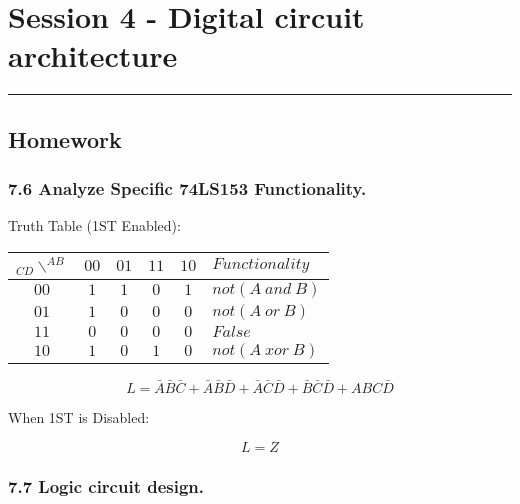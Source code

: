 \section{Session 4 - Digital circuit architecture}
\vspace{-15pt}\noindent\rule{\textwidth}{0.1pt}\vspace{-10pt}
    \subsection{Homework}
    \subsubsection{7.6 \textnormal{Analyze Specific 74LS153 Functionality}.}
    {\color{hwSolution}
        Truth Table (1ST Enabled):
        \begin{center}
            \begin{tabular}{c|c c c c|l}
                $_{CD}\backslash^{AB}$ & $00$ & $01$ & $11$ & $10$ & $Functionality$\\
                \hline
                $00$ & $1$ & $1$ & $0$ & $1$ & $not(A~and~B)$   \\
                $01$ & $1$ & $0$ & $0$ & $0$ & $not(A~or~B)$    \\
                $11$ & $0$ & $0$ & $0$ & $0$ & $False$          \\
                $10$ & $1$ & $0$ & $1$ & $0$ & $not(A~xor~B)$    \\
            \end{tabular}
        \end{center}
            \[L = \bar{A}\bar{B}\bar{C}+ \bar{A}\bar{B}\bar{D} + \bar{A}\bar{C}\bar{D} + \bar{B}\bar{C}\bar{D} + ABC\bar{D} \]

        When 1ST is Disabled:
        
            \[L = Z\]
    }

    \subsubsection{7.7 \textnormal{Logic circuit design}.}

